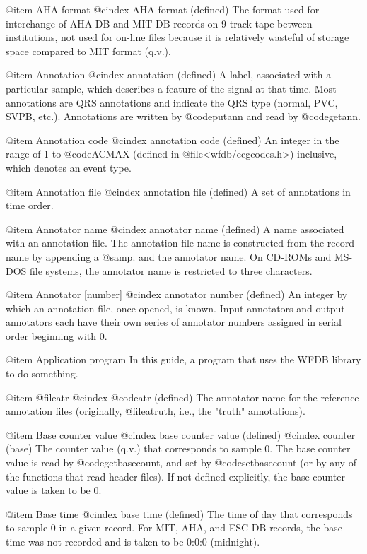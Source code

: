 {{{{{{{{{@item AHA format
@cindex AHA format (defined)
The format used for interchange of AHA DB and MIT DB records on 9-track
tape between institutions, not used for on-line files because it is
relatively wasteful of storage space compared to MIT format
(q.v.).

@item Annotation
@cindex annotation (defined)
A label, associated with a particular sample, which describes a feature
of the signal at that time.  Most annotations are QRS annotations and
indicate the QRS type (normal, PVC, SVPB, etc.).  Annotations are
written by @code{putann} and read by @code{getann}.

@item Annotation code
@cindex annotation code (defined)
An integer in the range of 1 to @code{ACMAX} (defined in
@file{<wfdb/ecgcodes.h>}) inclusive, which denotes an event type.

@item Annotation file
@cindex annotation file (defined)
A set of annotations in time order.

@item Annotator name
@cindex annotator name (defined)
A name associated with an annotation file.  The annotation file name is
constructed from the record name by appending a @samp{.} and the annotator
name.  On CD-ROMs and MS-DOS file systems, the annotator name is restricted
to three characters.

@item Annotator [number]
@cindex annotator number (defined)
An integer by which an annotation file, once opened, is known.  Input
annotators and output annotators each have their own series of annotator
numbers assigned in serial order beginning with 0.

@item Application program
In this guide, a program that uses the WFDB library to do
something.

@item @file{atr}
@cindex @code{atr} (defined)
The annotator name for the reference annotation files (originally,
@file{atruth}, i.e., the "truth" annotations).

@item Base counter value
@cindex base counter value (defined)
@cindex counter (base)
The counter value (q.v.) that corresponds to sample 0.  The base
counter value is read by @code{getbasecount}, and set by @code{setbasecount}
(or by any of the functions that read header files).  If not
defined explicitly, the base counter value is taken to be 0.

@item Base time
@cindex base time (defined)
The time of day that corresponds to sample 0 in a given record.  For
MIT, AHA, and ESC DB records, the base time was not recorded and is taken to
be 0:0:0 (midnight).

}}}}}}}}}
